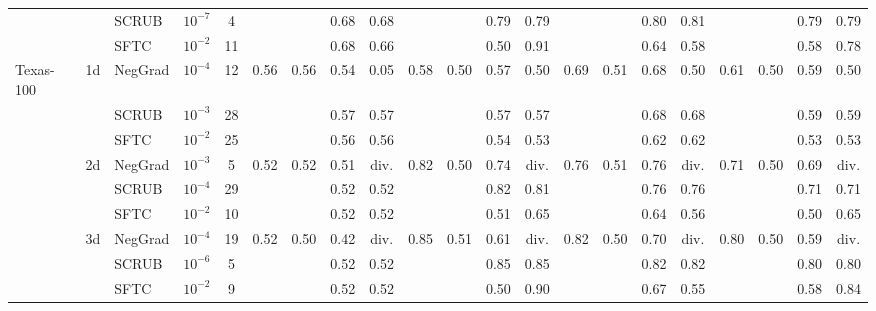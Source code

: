 \begin{table}[t]
{\begin{tabular}{l c l c c cccccccccccccccc}
 &  & SCRUB & $10^{-7}$ & 4 &  &  & 0.68 & 0.68 &  &  & 0.79 & 0.79 &  &  & 0.80 & 0.81 &  &  & 0.79 & 0.79 \\
 &  & SFTC & $10^{-2}$ & 11 &  &  & 0.68 & 0.66 &  &  & 0.50 & 0.91 &  &  & 0.64 & 0.58 &  &  & 0.58 & 0.78 \\
\midrule
Texas-100 & 1d & NegGrad & $10^{-4}$ & 12 & 0.56 & 0.56 & 0.54 & 0.05 & 0.58 & 0.50 & 0.57 & 0.50 & 0.69 & 0.51 & 0.68 & 0.50 & 0.61 & 0.50 & 0.59 & 0.50 \\
 &  & SCRUB & $10^{-3}$ & 28 &  &  & 0.57 & 0.57 &  &  & 0.57 & 0.57 &  &  & 0.68 & 0.68 &  &  & 0.59 & 0.59 \\
 &  & SFTC & $10^{-2}$ & 25 &  &  & 0.56 & 0.56 &  &  & 0.54 & 0.53 &  &  & 0.62 & 0.62 &  &  & 0.53 & 0.53 \\
\cmidrule(lr){2-21}
 & 2d & NegGrad & $10^{-3}$ & 5 & 0.52 & 0.52 & 0.51 & div. & 0.82 & 0.50 & 0.74 & div. & 0.76 & 0.51 & 0.76 & div. & 0.71 & 0.50 & 0.69 & div. \\
 &  & SCRUB & $10^{-4}$ & 29 &  &  & 0.52 & 0.52 &  &  & 0.82 & 0.81 &  &  & 0.76 & 0.76 &  &  & 0.71 & 0.71 \\
 &  & SFTC & $10^{-2}$ & 10 &  &  & 0.52 & 0.52 &  &  & 0.51 & 0.65 &  &  & 0.64 & 0.56 &  &  & 0.50 & 0.65 \\
\cmidrule(lr){2-21}
 & 3d & NegGrad & $10^{-4}$ & 19 & 0.52 & 0.50 & 0.42 & div. & 0.85 & 0.51 & 0.61 & div. & 0.82 & 0.50 & 0.70 & div. & 0.80 & 0.50 & 0.59 & div. \\
 &  & SCRUB & $10^{-6}$ & 5 &  &  & 0.52 & 0.52 &  &  & 0.85 & 0.85 &  &  & 0.82 & 0.82 &  &  & 0.80 & 0.80 \\
 &  & SFTC & $10^{-2}$ & 9 &  &  & 0.52 & 0.52 &  &  & 0.50 & 0.90 &  &  & 0.67 & 0.55 &  &  & 0.58 & 0.84 \\
\bottomrule
\end{tabular}}
\end{table}
